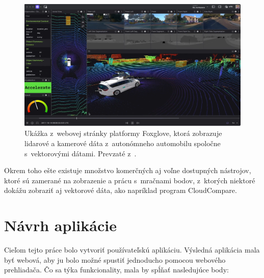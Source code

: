\begin{figure}[h]
    \centering
    \includegraphics[width=1\linewidth]{text_prace/obrazky-figures/Foxglove.png}
    \caption[Ukážka z~webovej stránky platformy Foxglove.]{Ukážka z~webovej stránky platformy Foxglove, ktorá zobrazuje lidarové a kamerové dáta z~autonómneho automobilu spoločne s~vektorovými dátami. Prevzaté z~\cite{foxglove}.}
    \label{fig:foxglove}
\end{figure}

Okrem toho ešte existuje množstvo komerčných aj voľne dostupných nástrojov, ktoré sú zamerané na zobrazenie a prácu s~mračnami bodov, z~ktorých niektoré dokážu zobraziť aj vektorové dáta, ako napríklad program CloudCompare.

\chapter{Návrh aplikácie}
\label{ch:navrh}

Cieľom tejto práce bolo vytvoriť používateľskú aplikáciu. Výsledná aplikácia mala byť webová, aby ju bolo možné spustiť jednoducho pomocou webového prehliadača. Čo sa týka funkcionality, mala by spĺňať nasledujúce body:

